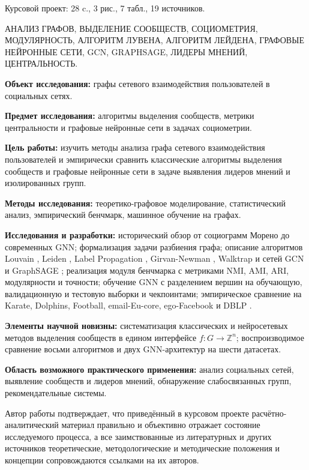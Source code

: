 \documentclass[14pt,a4paper]{extarticle}
\begin{document}
Курсовой проект: 28 c., 3 рис., 7 табл., 19 источников.

\medskip
\noindent АНАЛИЗ ГРАФОВ, ВЫДЕЛЕНИЕ СООБЩЕСТВ, СОЦИОМЕТРИЯ, МОДУЛЯРНОСТЬ, АЛГОРИТМ ЛУВЕНА, АЛГОРИТМ ЛЕЙДЕНА, ГРАФОВЫЕ НЕЙРОННЫЕ СЕТИ, GCN, GRAPHSAGE, ЛИДЕРЫ МНЕНИЙ, ЦЕНТРАЛЬНОСТЬ.

\medskip
\textbf{Объект исследования:} графы сетевого взаимодействия пользователей в социальных сетях.

\textbf{Предмет исследования:} алгоритмы выделения сообществ, метрики центральности и графовые нейронные сети в задачах социометрии.

\textbf{Цель работы:} изучить методы анализа графа сетевого взаимодействия пользователей и эмпирически сравнить классические алгоритмы выделения сообществ и графовые нейронные сети в задаче выявления лидеров мнений и изолированных групп.

\textbf{Методы исследования:} теоретико-графовое моделирование, статистический анализ, эмпирический бенчмарк, машинное обучение на графах.

\textbf{Исследования и разработки:} исторический обзор от социограмм Морено \cite{moreno1934} до современных GNN; формализация задачи разбиения графа; описание алгоритмов Louvain \cite{blondel2008}, Leiden \cite{traag2019}, Label Propagation \cite{raghavan2007}, Girvan-Newman \cite{girvan2002}, Walktrap \cite{pons2006} и сетей GCN \cite{kipf2017} и GraphSAGE \cite{hamilton2017}; реализация модуля бенчмарка с метриками NMI, AMI, ARI, модулярности и точности; обучение GNN с разделением вершин на обучающую, валидационную и тестовую выборки и чекпоинтами; эмпирическое сравнение на Karate, Dolphins, Football, email-Eu-core, ego-Facebook и DBLP \cite{snap}.

\textbf{Элементы научной новизны:} систематизация классических и нейросетевых методов выделения сообществ в едином интерфейсе $f \colon G \to \mathbb{Z}^n$; воспроизводимое сравнение восьми алгоритмов и двух GNN-архитектур на шести датасетах.

\textbf{Область возможного практического применения:} анализ социальных сетей, выявление сообществ и лидеров мнений, обнаружение слабосвязанных групп, рекомендательные системы.

\medskip
Автор работы подтверждает, что приведённый в курсовом проекте расчётно-аналитический материал правильно и объективно отражает состояние исследуемого процесса, а все заимствованные из литературных и других источников теоретические, методологические и методические положения и концепции сопровождаются ссылками на их авторов.
\end{document}
